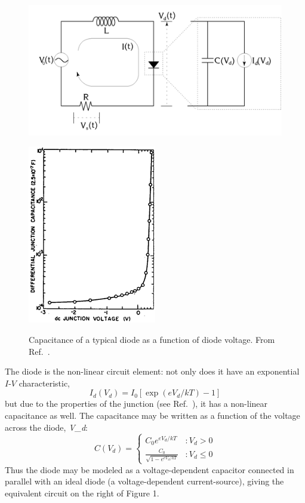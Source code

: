 \documentclass{../lab}
\begin{document}
\begin{figure}[h]
    \centering
    \href{http://experimentationlab.berkeley.edu/sites/default/files/images/Nldimage004.gif}{\includegraphics[width=0.5\linewidth]{images/Nldimage004.png}}
    \caption{}
    \label{fig:Circuit}
\end{figure}

\begin{figure}[h]
    \centering
    \href{http://experimentationlab.berkeley.edu/sites/default/files/images/Nldimage005.gif}{\includegraphics[width=0.4\linewidth]{images/Nldimage005.png}}
    \caption{Capacitance of a typical diode as a function of diode voltage. From Ref.~\cite{Hao}.}
    \label{fig:CapacitanceOfTypicalDiode}
\end{figure}

The diode is the non-linear circuit element: not only does it have an exponential $I$-$V$ characteristic,
\[
    I_d(V_d) = I_0[\exp(eV_d / kT) - 1]
\]
but due to the properties of the junction (see Ref.~\cite{Cvitanovic}), it has a non-linear capacitance as well. The capacitance may be written as a function of the voltage across the diode, \emph{V_{d}}:
\[
    C(V_d) =
    \begin{cases}
        C_0 e^{eV_d/kT} &: V_d > 0 \\
        \frac{C_0}{\sqrt {1-e^{eV_d/kT}}} &: V_d \le 0
    \end{cases}
\]
Thus the diode may be modeled as a voltage-dependent capacitor connected in parallel with an ideal diode (a voltage-dependent current-source), giving the equivalent circuit on the right of Figure 1.
\end{document}
